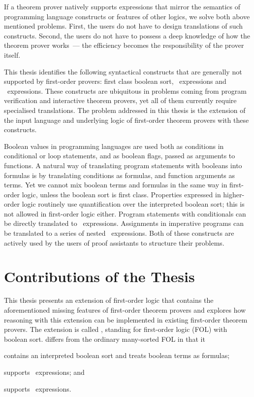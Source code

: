 If a theorem prover natively supports expressions that mirror the semantics of programming language constructs or features of other logics, we solve both above mentioned problems. First, the users do not have to design translations of such constructs. Second, the users do not have to possess a deep knowledge of how the theorem prover works~--- the efficiency becomes the responsibility of the prover itself.

This thesis identifies the following syntactical constructs that are generally not supported by first-order provers: first class boolean sort, \ITE\ expressions and \LETIN\ expressions. These constructs are ubiquitous in problems coming from program verification and interactive theorem provers, yet all of them currently require specialised translations. The problem addressed in this thesis is the extension of the input language and underlying logic of first-order theorem provers with these constructs.

Boolean values in programming languages are used both as conditions in conditional or loop statements, and as boolean flags, passed as arguments to functions. A natural way of translating program statements with booleans into formulas is by translating conditions as formulas, and function arguments as terms. Yet we cannot mix boolean terms and formulas in the same way in first-order logic, unless the boolean sort is first class. Properties expressed in higher-order logic routinely use quantification over the interpreted boolean sort; this is not allowed in first-order logic either. Program statements with conditionals can be directly translated to \ITE\ expressions. Assignments in imperative programs can be translated to a series of nested \LETIN\ expressions. Both of these constructs are actively used by the users of proof assistants to structure their problems. %

\section{Contributions of the Thesis}\label{sect:intro:contributions}
This thesis presents an extension of first-order logic that contains the aforementioned missing features of first-order theorem provers and explores how reasoning with this extension can be implemented in existing first-order theorem provers. The extension is called \folb{}, standing for first-order logic (FOL) with boolean sort. \folb{} differs from the ordinary many-sorted FOL in that it \begin{enumerate*}[label=(\roman*)]\item contains an interpreted boolean sort and treats boolean terms as formulas; \item supports \ITE\ expressions; and \item supports \LETIN\ expressions.\end{enumerate*}

